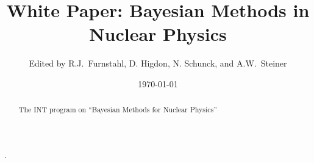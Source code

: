 \documentclass[12pt]{article}
\begin{document}
\title{White Paper: Bayesian Methods in Nuclear Physics}

\author{Edited by R.J.\ Furnstahl, D. Higdon, N. Schunck, and A.W.\ Steiner}

\date{\today\vspace {1.8in}}

\maketitle

\begin{abstract}
	The INT program on ``Bayesian Methods for Nuclear Physics''
\end{abstract}

\newpage


\newpage


.


\setcounter{tocdepth}{2}
\tableofcontents{}

\newpage









\clearpage

\appendix








\clearpage
{}
  

\end{document}
